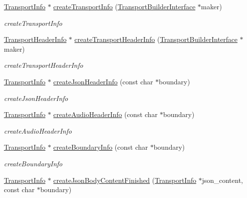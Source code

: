 \begin{DoxyCompactItemize}
\item 
\hyperlink{classAlexaEvent_1_1TransportInfo}{Transport\+Info} $\ast$ \hyperlink{classAlexaEvent_1_1TransportMaker_aea75955275f3f8a64424d03f87b33dbe}{create\+Transport\+Info} (\hyperlink{classAlexaEvent_1_1TransportBuilderInterface}{Transport\+Builder\+Interface} $\ast$maker)
\begin{DoxyCompactList}\small\item\em create\+Transport\+Info \end{DoxyCompactList}\item 
\hyperlink{classAlexaEvent_1_1TransportHeaderInfo}{Transport\+Header\+Info} $\ast$ \hyperlink{classAlexaEvent_1_1TransportMaker_a3bdf1b3d41417c3edd24769831457ebf}{create\+Transport\+Header\+Info} (\hyperlink{classAlexaEvent_1_1TransportBuilderInterface}{Transport\+Builder\+Interface} $\ast$maker)
\begin{DoxyCompactList}\small\item\em create\+Transport\+Header\+Info \end{DoxyCompactList}\item 
\hyperlink{classAlexaEvent_1_1TransportInfo}{Transport\+Info} $\ast$ \hyperlink{classAlexaEvent_1_1TransportMaker_a294732327697810e82e7b82bbcbf5aaa}{create\+Json\+Header\+Info} (const char $\ast$boundary)
\begin{DoxyCompactList}\small\item\em create\+Json\+Header\+Info \end{DoxyCompactList}\item 
\hyperlink{classAlexaEvent_1_1TransportInfo}{Transport\+Info} $\ast$ \hyperlink{classAlexaEvent_1_1TransportMaker_acbbf4e90a8350fa760cf8cc072ed2501}{create\+Audio\+Header\+Info} (const char $\ast$boundary)
\begin{DoxyCompactList}\small\item\em create\+Audio\+Header\+Info \end{DoxyCompactList}\item 
\hyperlink{classAlexaEvent_1_1TransportInfo}{Transport\+Info} $\ast$ \hyperlink{classAlexaEvent_1_1TransportMaker_ae7337a2522cea0ced276ff43be504800}{create\+Boundary\+Info} (const char $\ast$boundary)
\begin{DoxyCompactList}\small\item\em create\+Boundary\+Info \end{DoxyCompactList}\item 
\hyperlink{classAlexaEvent_1_1TransportInfo}{Transport\+Info} $\ast$ \hyperlink{classAlexaEvent_1_1TransportMaker_a8c54ff95e4a0687e6e6e19e80b11cecb}{create\+Json\+Body\+Content\+Finished} (\hyperlink{classAlexaEvent_1_1TransportInfo}{Transport\+Info} $\ast$json\+\_\+content, const char $\ast$boundary)

\end{DoxyCompactItemize}

